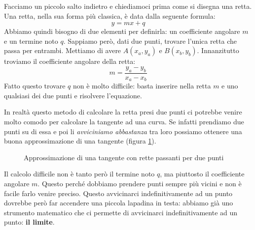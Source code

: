 Facciamo un piccolo salto indietro e chiediamoci prima come si disegna una retta. Una retta, nella sua forma più classica, è data dalla seguente formula:
\begin{equation*}
	y = mx + q
\end{equation*}
Abbiamo quindi bisogno di due elementi per definirla: un coefficiente angolare $m$ e un termine noto $q$. Sappiamo però, dati due punti, trovare l'unica retta che passa per entrambi. Mettiamo di avere $A(x_a, y_a)$ e $B(x_b, y_b)$. Innanzitutto troviamo il coefficiente angolare della retta:
\begin{equation*}
	m = \dfrac{y_a - y_b}{x_a - x_b}
\end{equation*}
Fatto questo trovare $q$ non è molto difficile: basta inserire nella retta $m$ e uno qualsiasi dei due punti e risolvere l'equazione.

In realtà questo metodo di calcolare la retta presi due punti ci potrebbe venire molto comodo per calcolare la tangente ad una curva. Se infatti prendiamo due punti su di essa e poi li \textit{avviciniamo abbastanza} tra loro possiamo ottenere una buona approssimazione di una tangente (figura \ref{ApproxTangenteCurva}).



\begin{figure}[h]
\centering
{}
  \caption{Approssimazione di una tangente con rette passanti per due punti} 
	\label{ApproxTangenteCurva}
\end{figure}

Il calcolo difficile non è tanto però il termine noto $q$, ma piuttosto il coefficiente angolare $m$. Questo perché dobbiamo prendere punti sempre più vicini e non è facile farlo venire preciso. Questo avvicinarci indefinitivamente ad un punto dovrebbe però far accendere una piccola lapadina in testa: abbiamo già uno strumento matematico che ci permette di avvicinarci indefinitivamente ad un punto: \textbf{il limite}. 

